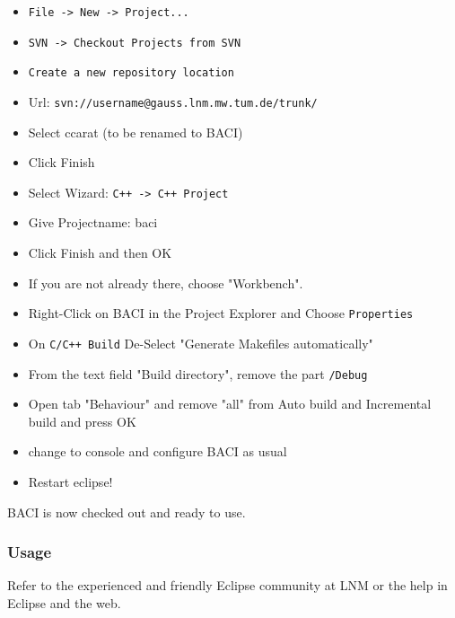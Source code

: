 \begin{itemize}
\item \texttt{File -> New -> Project...}
\item  \texttt{SVN -> Checkout Projects from SVN}
\item  \texttt{Create a new repository location}
\item  Url: \texttt{svn://username@gauss.lnm.mw.tum.de/trunk/}

\item Select ccarat (to be renamed to BACI)

\item Click Finish

\item Select Wizard: \texttt{C++ -> C++ Project}

\item Give Projectname: baci

\item Click Finish and then OK

\item If you are not already there, choose "Workbench".

\item Right-Click on BACI in the Project Explorer and Choose \texttt{Properties}

\item On \texttt{C/C++ Build} De-Select "Generate Makefiles automatically"

\item From the text field "Build directory", remove the part \texttt{/Debug}

\item Open tab "Behaviour" and remove "all" from Auto build and Incremental build and press OK

\item change to console and configure BACI as usual

\item Restart eclipse!

\end{itemize}
BACI is now checked out and ready to use.

\subsubsection{Usage}

Refer to the experienced and friendly Eclipse community at LNM or the help in Eclipse and the web.